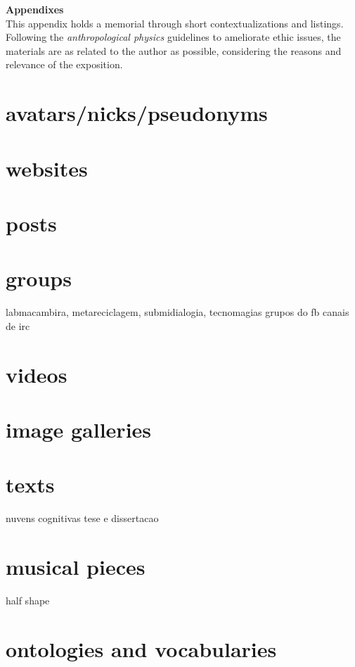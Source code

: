 \documentclass[a4paper]{article}
\begin{document}
\clearpage
{} 
\begin{appendices}
{\Large \bf Appendixes}
\\

This appendix holds a memorial through short contextualizations
and listings.
Following the \emph{anthropological physics} guidelines to ameliorate
ethic issues, the materials are as related to the author as possible,
considering the reasons and relevance of the exposition.

\section{avatars/nicks/pseudonyms}\label{avatar}
\section{websites}
\section{posts}\label{posts}
\section{groups}
labmacambira, metareciclagem, submidialogia, tecnomagias
grupos do fb
canais de irc
\section{videos}
\section{image galleries}
\section{texts}
nuvens cognitivas
tese e dissertacao
\section{musical pieces}
half shape
\section{ontologies and vocabularies}
\end{appendices}
\end{document}
